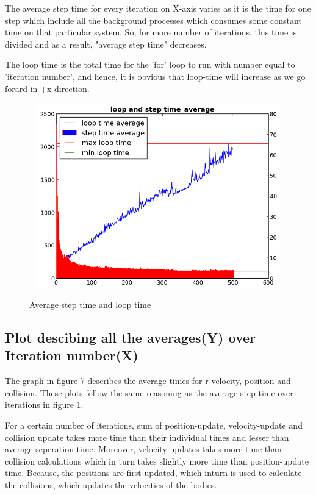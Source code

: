 \documentclass[12pt,a4paper]{report}
\begin{document}
The average step time for every iteration on X-axis varies as it is the time for one step which include all the background processes which consumes some constant time on that particular system. So, for more number of iterations, this time is divided and as a result, "average step time" decreases. 

The loop time is the total time for the 'for' loop to run with number equal to 'iteration number', and hence, it is obvious that loop-time will increase as we go forard in +x-direction.

\begin{figure}
\includegraphics[width=12cm,height=8cm]{g20_project_plot01} 
\label{fig:plt1}
\caption{Average step time and loop time} 
\end{figure}

\subsection*{Plot descibing all the averages(Y) over Iteration number(X)}
\par The graph in figure-7 describes the average times for r velocity, position and collision. These plots follow the same reasoning as the average step-time over iterations in figure 1.

For a certain number of iterations, sum of position-update, velocity-update and collision update takes more time than their individual times and lesser than average seperation time. Moreover, velocity-updates takes more time than collision calculations which in turn takes slightly more time than position-update time. Because, the positions are first updated, which inturn is used to calculate the collisions, which updates the velocities of the bodies.
\end{document}
